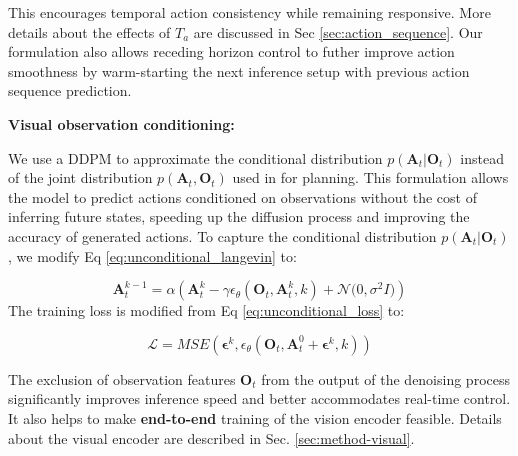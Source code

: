 This encourages temporal action consistency while remaining responsive. More details about the effects of $T_a$ are discussed in Sec \ref{sec:action_sequence}.
Our formulation also allows receding horizon control \cite{mayne1988receding} to futher improve action smoothness by warm-starting the next inference setup with previous action sequence prediction.
 




\textbf{Visual observation conditioning:}


We use a DDPM to approximate the conditional distribution $p(\mathbf{A}_t | \mathbf{O}_t)$ instead of the joint distribution $p(\mathbf{A}_t,\mathbf{O}_t)$ used in \citet{janner2022diffuser} for planning. This formulation allows the model to predict actions conditioned on observations without the cost of inferring future states, speeding up the diffusion process and improving the accuracy of generated actions.
To capture the conditional distribution $p(\mathbf{A}_t |\mathbf{O}_t)$, we modify Eq \ref{eq:unconditional_langevin} to:

\begin{equation}
    \label{eq:diffusion_policy_langevin}
    \mathbf{A}^{k-1}_t = \alpha(\mathbf{A}^k_t - \gamma\epsilon_\theta(\mathbf{O}_t,\mathbf{A}^k_t,k) + \mathcal{N} \bigl(0, \sigma^2 I \bigl))

\end{equation}
The training loss is modified from Eq \ref{eq:unconditional_loss} to:


\begin{equation}
    \label{eq:diffusion_policy_loss}
    \mathcal{L}=MSE(\mathbf{\epsilon}^k,\epsilon_\theta(\mathbf{O}_t, \mathbf{A}^0_t + \mathbf{\epsilon}^k, k))

\end{equation}

The exclusion of observation features $\mathbf{O}_t$ from the output of the denoising process significantly improves inference speed and better accommodates real-time control. It also helps to make \textbf{end-to-end} training of the vision encoder feasible.
Details about the visual encoder are described in Sec. \ref{sec:method-visual}.


































